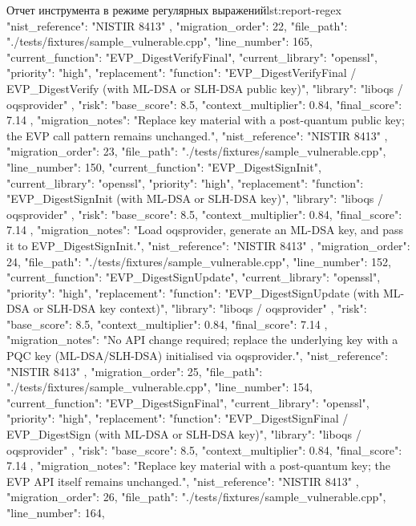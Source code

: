 \documentclass{itmo-vkr}
\begin{document}
\begin{itmolisting}[JSON]{Отчет инструмента в режиме регулярных выражений}{lst:report-regex}
{{			"nist_reference": "NISTIR 8413"
		},
		{
			"migration_order": 22,
			"file_path": "./tests/fixtures/sample_vulnerable.cpp",
			"line_number": 165,
			"current_function": "EVP_DigestVerifyFinal",
			"current_library": "openssl",
			"priority": "high",
			"replacement": {
				"function": "EVP_DigestVerifyFinal / EVP_DigestVerify (with ML-DSA or SLH-DSA public key)",
				"library": "liboqs / oqsprovider"
			},
			"risk": {
				"base_score": 8.5,
				"context_multiplier": 0.84,
				"final_score": 7.14
			},
			"migration_notes": "Replace key material with a post-quantum public key; the EVP call pattern remains unchanged.",
			"nist_reference": "NISTIR 8413"
		},
		{
			"migration_order": 23,
			"file_path": "./tests/fixtures/sample_vulnerable.cpp",
			"line_number": 150,
			"current_function": "EVP_DigestSignInit",
			"current_library": "openssl",
			"priority": "high",
			"replacement": {
				"function": "EVP_DigestSignInit (with ML-DSA or SLH-DSA key)",
				"library": "liboqs / oqsprovider"
			},
			"risk": {
				"base_score": 8.5,
				"context_multiplier": 0.84,
				"final_score": 7.14
			},
			"migration_notes": "Load oqsprovider, generate an ML-DSA key, and pass it to EVP_DigestSignInit.",
			"nist_reference": "NISTIR 8413"
		},
		{
			"migration_order": 24,
			"file_path": "./tests/fixtures/sample_vulnerable.cpp",
			"line_number": 152,
			"current_function": "EVP_DigestSignUpdate",
			"current_library": "openssl",
			"priority": "high",
			"replacement": {
				"function": "EVP_DigestSignUpdate (with ML-DSA or SLH-DSA key context)",
				"library": "liboqs / oqsprovider"
			},
			"risk": {
				"base_score": 8.5,
				"context_multiplier": 0.84,
				"final_score": 7.14
			},
			"migration_notes": "No API change required; replace the underlying key with a PQC key (ML-DSA/SLH-DSA) initialised via oqsprovider.",
			"nist_reference": "NISTIR 8413"
		},
		{
			"migration_order": 25,
			"file_path": "./tests/fixtures/sample_vulnerable.cpp",
			"line_number": 154,
			"current_function": "EVP_DigestSignFinal",
			"current_library": "openssl",
			"priority": "high",
			"replacement": {
				"function": "EVP_DigestSignFinal / EVP_DigestSign (with ML-DSA or SLH-DSA key)",
				"library": "liboqs / oqsprovider"
			},
			"risk": {
				"base_score": 8.5,
				"context_multiplier": 0.84,
				"final_score": 7.14
			},
			"migration_notes": "Replace key material with a post-quantum key; the EVP API itself remains unchanged.",
			"nist_reference": "NISTIR 8413"
		},
		{
			"migration_order": 26,
			"file_path": "./tests/fixtures/sample_vulnerable.cpp",
			"line_number": 164,
}}
\end{itmolisting}
\end{document}
